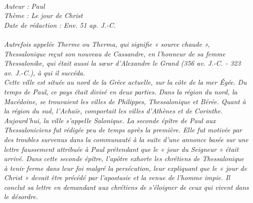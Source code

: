 \BFont
\noindent\hrulefill
{\footnotesize
\textit{
\bigskip
{\centering{}
\\Auteur : Paul
\\Thème : Le jour de Christ
\\Date de rédaction : Env. 51 ap. J.-C.\\}
}
\textit{
\\Autrefois appelée Therme ou Therma, qui signifie « source chaude », Thessalonique reçut son nouveau de Cassandre, en l'honneur de sa femme Thessalonike, qui était aussi la sœur d'Alexandre le Grand (356 av. J.-C. - 323 av. J.-C.), à qui il succéda.
\\Cette ville est située au nord de la Grèce actuelle, sur la côte de la mer Égée. Du temps de Paul, ce pays était divisé en deux parties. Dans la région du nord, la Macédoine, se trouvaient les villes de Philippes, Thessalonique et Bérée. Quant à la région du sud, l'Achaïe, comportait les villes d'Athènes et de Corinthe. Aujourd'hui, la ville s'appelle Salonique.
La seconde épître de Paul aux Thessaloniciens fut rédigée peu de temps après la première. Elle fut motivée par des troubles survenus dans la communauté à la suite d'une annonce basée sur une lettre faussement attribuée à Paul prétendant que le « jour du Seigneur » était arrivé. Dans cette seconde épître, l'apôtre exhorte les chrétiens de Thessalonique à tenir ferme dans leur foi malgré la persécution, leur expliquant que le « jour de Christ » devait être précédé par l'apostasie et la venue de l'homme impie. Il conclut sa lettre en demandant aux chrétiens de s'éloigner de ceux qui vivent dans le désordre.\bigskip
}
}
\par\nobreak\noindent\hrulefill
